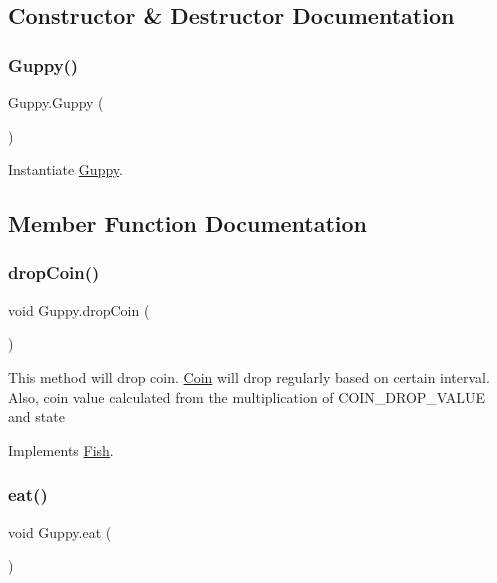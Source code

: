\subsection{Constructor \& Destructor Documentation}
\mbox{\label{class_guppy_a6336822c9cc2106fad2aaa2e54d159ac}} 
\subsubsection{\texorpdfstring{Guppy()}{Guppy()}}
{\footnotesize\ttfamily Guppy.\+Guppy (\begin{DoxyParamCaption}{ }\end{DoxyParamCaption})\hspace{0.3cm}{\ttfamily [inline]}}

Instantiate \mbox{\hyperlink{class_guppy}{Guppy}}. 

\subsection{Member Function Documentation}
\mbox{\label{class_guppy_ace5750be512718d97f184f6ede72d25f}} 
\subsubsection{\texorpdfstring{drop\+Coin()}{dropCoin()}}
{\footnotesize\ttfamily void Guppy.\+drop\+Coin (\begin{DoxyParamCaption}{ }\end{DoxyParamCaption})\hspace{0.3cm}{\ttfamily [inline]}}

This method will drop coin. \mbox{\hyperlink{class_coin}{Coin}} will drop regularly based on certain interval. Also, coin value calculated from the multiplication of C\+O\+I\+N\+\_\+\+D\+R\+O\+P\+\_\+\+V\+A\+L\+UE and state 

Implements \mbox{\hyperlink{interface_fish_ad37facd4d5859411cf433520f03ae0b8}{Fish}}.

\mbox{\label{class_guppy_a8cae34f3e9f4011e41da1d098363f1fc}} 
\subsubsection{\texorpdfstring{eat()}{eat()}}
{\footnotesize\ttfamily void Guppy.\+eat (\begin{DoxyParamCaption}{ }\end{DoxyParamCaption})\hspace{0.3cm}{\ttfamily [inline]}}

